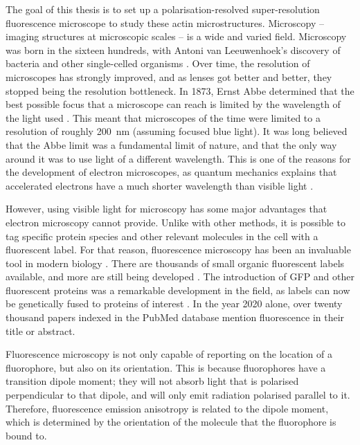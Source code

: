 The goal of this thesis is to set up a polarisation-resolved super-resolution fluorescence microscope to study these actin microstructures.	Microscopy -- imaging structures at microscopic scales -- is a wide and varied field. Microscopy was born in the sixteen hundreds, with Antoni van Leeuwenhoek's discovery of bacteria and other single-celled organisms \cite{VanZuylen1981}. Over time, the resolution of microscopes has strongly improved, and as lenses got better and better, they stopped being the resolution bottleneck. In 1873, Ernst Abbe determined that the best possible focus that a microscope can reach is limited by the wavelength of the light used \cite{Abbe1873}. This meant that microscopes of the time were limited to a resolution of roughly 200~nm (assuming focused blue light). It was long believed that the Abbe limit was a fundamental limit of nature, and that the only way around it was to use light of a different wavelength. This is one of the reasons for the development of electron microscopes, as quantum mechanics explains that accelerated electrons have a much shorter wavelength than visible light \cite{Smith2008}. 

However, using visible light for microscopy has some major advantages that electron microscopy cannot provide. Unlike with other methods, it is possible to tag specific protein species and other relevant molecules in the cell with a fluorescent label. For that reason, fluorescence microscopy has been an invaluable tool in modern biology \cite{Danial2016}.  There are thousands of small organic fluorescent labels available, and more are still being developed \cite{Zhang2002, Resch-Genger2008}. The introduction of GFP and other fluorescent proteins was a remarkable development in the field, as labels can now be genetically fused to proteins of interest \cite{Shaner2005, Matlashov2020}. In the year 2020 alone, over twenty thousand papers indexed in the PubMed database mention fluorescence in their title or abstract.

Fluorescence microscopy is not only capable of reporting on the location of a fluorophore, but also on its orientation. This is because fluorophores have a transition dipole moment; they will not absorb light that is polarised perpendicular to that dipole, and will only emit radiation polarised parallel to it. Therefore, fluorescence emission anisotropy is related to the dipole moment, which is determined by the orientation of the molecule that the fluorophore is bound to.

